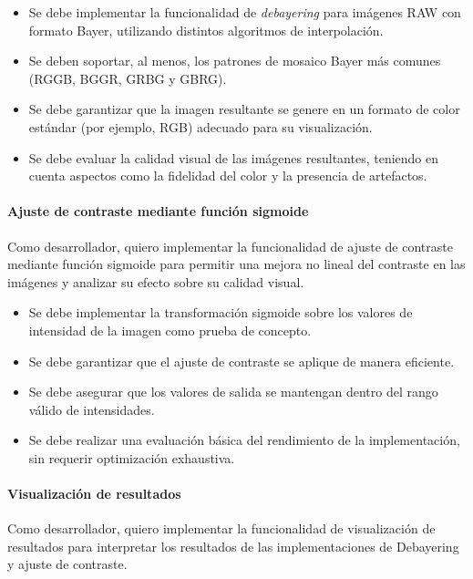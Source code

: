 \begin{itemize}[noitemsep]
	\item Se debe implementar la funcionalidad de \textit{debayering} para imágenes RAW con formato Bayer, utilizando 
	distintos algoritmos de interpolación.
	\item Se deben soportar, al menos, los patrones de mosaico Bayer más comunes (RGGB, BGGR, GRBG y GBRG).
	\item Se debe garantizar que la imagen resultante se genere en un formato de color estándar (por ejemplo, RGB) adecuado para su visualización.
	\item Se debe evaluar la calidad visual de las imágenes resultantes, teniendo en cuenta aspectos como la fidelidad del color y la presencia de artefactos.
\end{itemize}

\paragraph{Ajuste de contraste mediante función sigmoide} \label{hist:ajuste_contraste_funcion_sigmoide}
Como desarrollador, quiero implementar la funcionalidad de ajuste de contraste mediante función sigmoide para
permitir una mejora no lineal del contraste en las imágenes y analizar su efecto sobre su calidad visual.

\begin{itemize}[noitemsep]
	\item Se debe implementar la transformación sigmoide sobre los valores de intensidad de la imagen como prueba de concepto.
	\item Se debe garantizar que el ajuste de contraste se aplique de manera eficiente.
	\item Se debe asegurar que los valores de salida se mantengan dentro del rango válido de intensidades.
	\item Se debe realizar una evaluación básica del rendimiento de la implementación, sin requerir optimización exhaustiva.
\end{itemize}

\newpage

\paragraph{Visualización de resultados} \label{hist:visualizacion_resultados}
Como desarrollador, quiero implementar la funcionalidad de visualización de resultados para interpretar
los resultados de las implementaciones de Debayering y ajuste de contraste.

